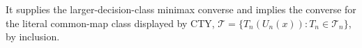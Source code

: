 It supplies the larger-decision-class minimax converse and implies the converse for the literal common-map class displayed by CTY, \(\mathcal T=\{T_n(U_n(x)):T_n\in\mathcal T_n\}\), by inclusion.